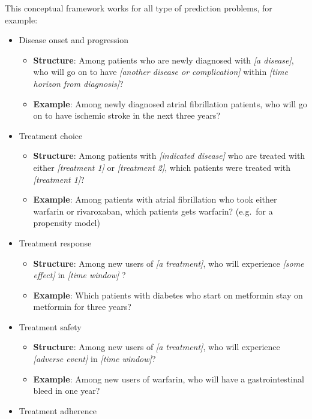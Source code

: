 \documentclass[11pt]{book}
\providecommand{\tightlist}{%
  \setlength{\itemsep}{0pt}\setlength{\parskip}{0pt}}
\theoremstyle{definition}
\theoremstyle{definition}
\theoremstyle{definition}
\theoremstyle{remark}
\begin{document}
This conceptual framework works for all type of prediction problems, for example:

\begin{itemize}
\tightlist
\item
  Disease onset and progression

  \begin{itemize}
  \tightlist
  \item
    \textbf{Structure}: Among patients who are newly diagnosed with \emph{{[}a disease{]}}, who will go on to have \emph{{[}another disease or complication{]}} within \emph{{[}time horizon from diagnosis{]}}?
  \item
    \textbf{Example}: Among newly diagnosed atrial fibrillation patients, who will go on to have ischemic stroke in the next three years?
  \end{itemize}
\item
  Treatment choice

  \begin{itemize}
  \tightlist
  \item
    \textbf{Structure}: Among patients with \emph{{[}indicated disease{]}} who are treated with either \emph{{[}treatment 1{]}} or \emph{{[}treatment 2{]}}, which patients were treated with \emph{{[}treatment 1{]}}?
  \item
    \textbf{Example}: Among patients with atrial fibrillation who took either warfarin or rivaroxaban, which patients gets warfarin? (e.g.~for a propensity model)
  \end{itemize}
\item
  Treatment response

  \begin{itemize}
  \tightlist
  \item
    \textbf{Structure}: Among new users of \emph{{[}a treatment{]}}, who will experience \emph{{[}some effect{]}} in \emph{{[}time window{]}} ?
  \item
    \textbf{Example}: Which patients with diabetes who start on metformin stay on metformin for three years?
  \end{itemize}
\item
  Treatment safety

  \begin{itemize}
  \tightlist
  \item
    \textbf{Structure}: Among new users of \emph{{[}a treatment{]}}, who will experience \emph{{[}adverse event{]}} in \emph{{[}time window{]}}?
  \item
    \textbf{Example}: Among new users of warfarin, who will have a gastrointestinal bleed in one year?
  \end{itemize}
\item
  Treatment adherence


\end{itemize}
\end{document}
